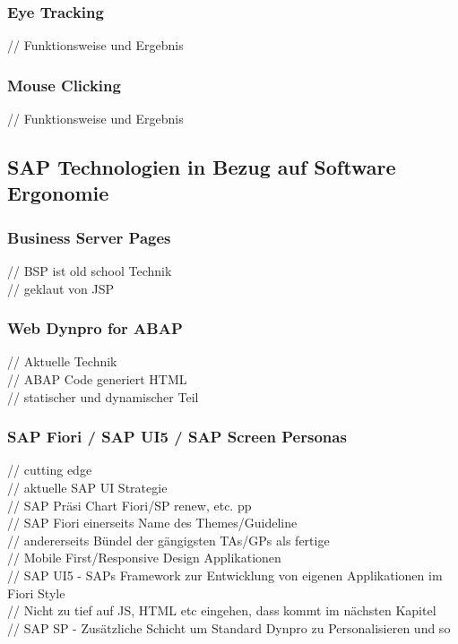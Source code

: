 \documentclass[12pt,a4paper,bibliography=totocnumbered,listof=totocnumbered]{scrartcl}
\begin{document}
\subsubsection{Eye Tracking}
// Funktionsweise und Ergebnis\\

\subsubsection{Mouse Clicking}
// Funktionsweise und Ergebnis\\

\subsection{SAP Technologien in Bezug auf Software Ergonomie}
\subsubsection{Business Server Pages}
// \ac{BSP} ist old school Technik\\
// geklaut von \ac{JSP}\\

\subsubsection{Web Dynpro for ABAP}
// Aktuelle Technik\\
// ABAP Code generiert HTML\\
// statischer und dynamischer Teil\\

\subsubsection{SAP Fiori / SAP UI5 / SAP Screen Personas}
// cutting edge\\
// aktuelle SAP UI Strategie\\
// SAP Präsi Chart Fiori/SP renew, etc. pp\\
// SAP Fiori einerseits Name des Themes/Guideline\\
// andererseits Bündel der gängigsten TAs/GPs als fertige\\
// Mobile First/Responsive Design Applikationen\\
// SAP UI5 - SAPs Framework zur Entwicklung von eigenen Applikationen im Fiori Style\\
// Nicht zu tief auf JS, HTML etc eingehen, dass kommt im nächsten Kapitel\\
// SAP SP - Zusätzliche Schicht um Standard Dynpro zu Personalisieren und so\\
\end{document}
